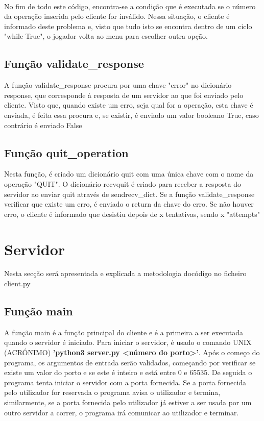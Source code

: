 \documentclass{report}
\begin{document}
\paragraph{}
No fim de todo este código, encontra-se a condição que é executada se o número da operação inserida pelo cliente for inválido. Nessa situação, o cliente é informado deste problema e, visto que tudo isto se encontra dentro de um ciclo "while True", o jogador volta ao menu para escolher outra opção.
\subsection{Função validate\_response}
\label{ssec:validate}
A função validate\_response procura por uma chave "error" no dicionário response, que corresponde à resposta de um servidor
ao que foi enviado pelo cliente. Visto que, quando existe um erro, seja qual for a operação, esta chave é enviada, é feita essa
procura e, se existir, é enviado um valor booleano True, caso contrário é enviado False

\subsection{Função quit\_operation}
\label{ssec:quit}
Nesta função, é criado um dicionário quit com uma única chave com o nome da operação "QUIT". O dicionário recvquit é criado
para receber a resposta do servidor ao enviar quit através de sendrecv\_dict. Se a função validate\_response verificar que existe
um erro, é enviado o return da chave do erro. Se não houver erro, o cliente é informado que desistiu depois de x tentativas,
sendo x "attempts"

\section{Servidor}
\label{sec:server}
Nesta secção será apresentada e explicada a metodologia docódigo no ficheiro client.py

\subsection{Função main}
\label{ssec:func_main}

A função main é a função principal do cliente e é a primeira a ser executada quando o servidor é iniciado. Para iniciar o servidor, é usado o comando UNIX (ACRÓNIMO) \textbf{'python3 server.py <número do porto>'}. Após o começo do programa, os argumentos de entrada serão validados, começando por verificar se existe um valor do porto e se este é inteiro e está entre 0 e 65535. De seguida o programa tenta iniciar o servidor com a porta fornecida. Se a porta fornecida pelo utilizador for reservada o programa avisa o utilizador e termina, similarmente, se a porta fornecida pelo utilizador já estiver a ser usada por um outro servidor a correr, o programa irá comunicar ao utilizador e terminar. 
\end{document}
